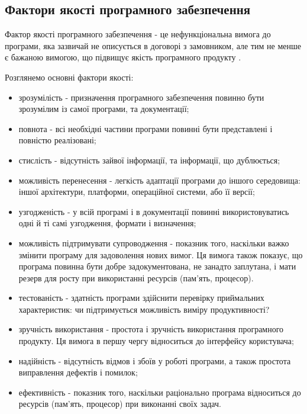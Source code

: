 \subsection{Фактори якості програмного забезпечення}

Фактор якості програмного забезпечення - це нефункціональна
вимога до програми, яка зазвичай не описується в договорі
з замовником, але тим не менше є бажаною вимогою, що підвищує
якість програмного продукту \cite{os-development,testing-black,test-automation-article}.

Розглянемо основні фактори якості:

\begin{itemize}
    \item зрозумілість - призначення програмного забезпечення 
      повинно бути зрозумілим із самої програми, та документації;
    \item повнота - всі необхідні частини програми
      повинні бути представлені і повністю реалізовані;
    \item стислість - відсутність зайвої інформації,
      та інформації, що дублюється;
    \item можливість перенесення - легкість адаптації
      програми до іншого середовища: іншої архітектури,
      платформи, операційної системи, або її версії;
    \item узгодженість - у всій програмі і в документації
      повинні використовуватись одні й ті самі узгодження, формати і визначення;
    \item можливість підтримувати супроводження - показник
      того, наскільки важко змінити програму для задоволення нових вимог.
      Ця вимога також показує, що програма повинна бути добре
      задокументована, не занадто заплутана, і мати резерв
      для росту при використанні ресурсів (пам’ять, процесор).
    \item тестованість - здатність програми здійснити перевірку
      приймальних характеристик: чи підтримується
      можливість виміру продуктивності?
    \item зручність використання - простота і зручність
      використання програмного продукту. Ця вимога
      в першу чергу відноситься до інтерфейсу користувача;
    \item надійність - відсутність відмов і збоїв у роботі
      програми, а також простота виправлення дефектів і помилок;
    \item ефективність - показник того, наскільки раціонально
      програма відноситься до ресурсів (пам’ять, процесор)
      при виконанні своїх задач.
\end{itemize}

